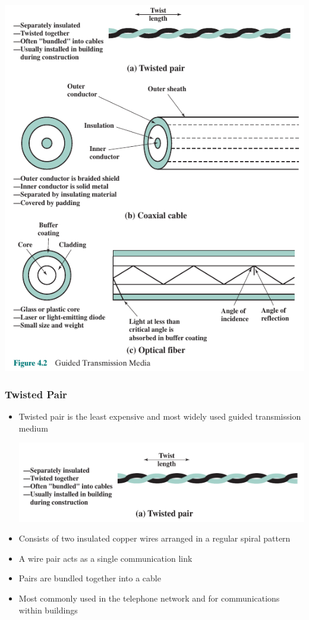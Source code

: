 \documentclass[pdflatex,compress]{beamer}
\begin{document}
\begin{frame}
	\begin{center}
		\includegraphics[width=0.5\linewidth]{img/img03a}
	\end{center}
\end{frame}

\begin{frame}
	\frametitle{Twisted Pair}
	\begin{itemize}
		\item Twisted pair is the least expensive and most widely used guided transmission medium
		\begin{center}
			\includegraphics[width=0.8\linewidth]{img/img03}
		\end{center}
		\item Consists of two insulated copper wires arranged in a regular spiral pattern
		\item A wire pair acts as a single communication link
		\item Pairs are bundled together into a cable
		\item Most commonly used in the telephone network and for communications within buildings
	\end{itemize}
\end{frame}
\end{document}
